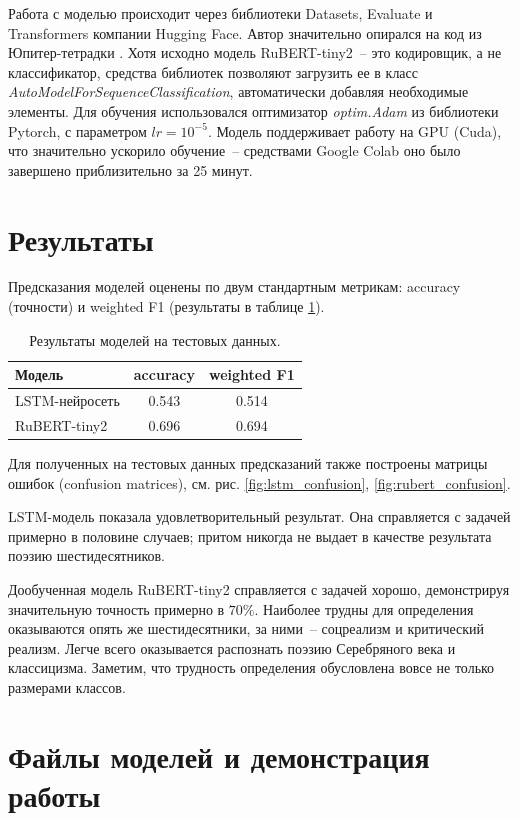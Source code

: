 \documentclass[a4paper,12pt]{article}
\begin{document}
Работа с моделью происходит через библиотеки Datasets, Evaluate и Transformers компании Hugging Face. Автор значительно опирался на код из Юпитер-тетрадки \cite{rubert_notebook}. Хотя исходно модель RuBERT-tiny2~-- это кодировщик, а не классификатор, средства библиотек позволяют загрузить ее в класс \textit{AutoModelForSequenceClassification}, автоматически добавляя необходимые элементы. Для обучения использовался оптимизатор \textit{optim.Adam} из библиотеки Pytorch, с параметром $lr = 10^{-5}$. Модель поддерживает работу на GPU (Cuda), что значительно ускорило обучение~-- средствами Google Colab оно было завершено приблизительно за 25 минут.


\section{Результаты}

Предсказания моделей оценены по двум стандартным метрикам: accuracy (точности) и weighted F1 (результаты в таблице \ref{tab:results}).

\begin{table}[t]
\centering
\begin{tabular}[t]{|l|c|c|}
    \hline
    Модель & accuracy & weighted F1 \\
    \hline
    LSTM-нейросеть & 0.543 & 0.514 \\
    RuBERT-tiny2 & 0.696 & 0.694 \\
    \hline
\end{tabular}
\caption{Результаты моделей на тестовых данных.}
\label{tab:results}
\end{table}

Для полученных на тестовых данных предсказаний также построены матрицы ошибок (confusion matrices), см. рис. \ref{fig:lstm_confusion}, \ref{fig:rubert_confusion}.

LSTM-модель показала удовлетворительный результат. Она справляется с задачей примерно в половине случаев; притом никогда не выдает в качестве результата поэзию шестидесятников.

Дообученная модель RuBERT-tiny2 справляется с задачей хорошо, демонстрируя значительную точность примерно в $70 \%$. Наиболее трудны для определения оказываются опять же шестидесятники, за ними~-- соцреализм и критический реализм. Легче всего оказывается распознать поэзию Серебряного века и классицизма. Заметим, что трудность определения обусловлена вовсе не только размерами классов.


\section{Файлы моделей и демонстрация работы}
\end{document}
